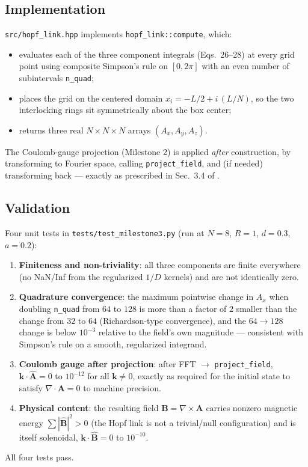 \documentclass[11pt, a4paper]{article}
\newcommand{\curl}{\nabla \times}
\renewcommand{\div}{\nabla \cdot}
\begin{document}
\subsection{Implementation}

\texttt{src/hopf\_link.hpp} implements \texttt{hopf\_link::compute}, which:
\begin{itemize}
    \item evaluates each of the three component integrals (Eqs.~26--28)
    at every grid point using composite Simpson's rule on $[0,2\pi]$ with
    an even number of subintervals \texttt{n\_quad};
    \item places the grid on the centered domain
    $x_i = -L/2 + i\,(L/N)$, so the two interlocking rings sit
    symmetrically about the box center;
    \item returns three real $N\times N\times N$ arrays
    $(A_x, A_y, A_z)$.
\end{itemize}
The Coulomb-gauge projection (Milestone 2) is applied \emph{after}
construction, by transforming to Fourier space, calling
\texttt{project\_field}, and (if needed) transforming back ---
exactly as prescribed in Sec.~3.4 of \citealp{foundation2026}.

\subsection{Validation}

Four unit tests in \texttt{tests/test\_milestone3.py} (run at $N=8$,
$R=1$, $d=0.3$, $a=0.2$):
\begin{enumerate}
    \item \textbf{Finiteness and non-triviality}: all three components are
    finite everywhere (no NaN/Inf from the regularized $1/D$ kernels) and
    are not identically zero.
    \item \textbf{Quadrature convergence}: the maximum pointwise change in
    $A_x$ when doubling \texttt{n\_quad} from $64$ to $128$ is more than a
    factor of $2$ smaller than the change from $32$ to $64$ (Richardson-type
    convergence), and the $64\to128$ change is below $10^{-3}$ relative to
    the field's own magnitude --- consistent with Simpson's rule on a
    smooth, regularized integrand.
    \item \textbf{Coulomb gauge after projection}: after FFT $\to$
    \texttt{project\_field}, $\mathbf{k}\cdot\hat{\mathbf{A}} = 0$ to
    $10^{-12}$ for all $\mathbf{k}\ne 0$, exactly as required for the
    initial state to satisfy $\div\mathbf{A}=0$ to machine precision.
    \item \textbf{Physical content}: the resulting field
    $\mathbf{B}=\curl\mathbf{A}$ carries nonzero magnetic energy
    $\sum |\hat{\mathbf{B}}|^2 > 0$ (the Hopf link is not a trivial/null
    configuration) and is itself solenoidal,
    $\mathbf{k}\cdot\hat{\mathbf{B}}=0$ to $10^{-10}$.
\end{enumerate}
All four tests pass.
\end{document}
